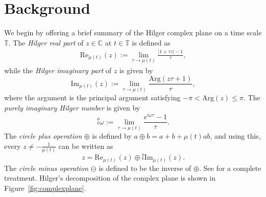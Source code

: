 \documentclass[reqno]{amsart}
\theoremstyle{plain}
\theoremstyle{definition}
\numberwithin{theorem}{section}
\numberwithin{definition}{section}
\numberwithin{prop}{section}
\numberwithin{example}{section}
\newcommand{\C}{\ensuremath{\mathbb{C}}}
\begin{document}
\section{Background}
We begin by offering a brief summary of the Hilger complex plane \cite{BoPeD} on a time scale $\mathbb{T}$. The {\em Hilger real part} of $z \in \C$ at $t \in \mathbb{T}$ is defined as
\begin{eqnarray*}
\text{Re}_{\mu(t)}(z):= \lim_{\tau \to \mu(t)} \frac{|1+\tau z|-1}{\tau},\end{eqnarray*}
while the {\em Hilger imaginary part} of $z$ is given by
\begin{equation}
\label{eq:HilgerImagPart}
    \text{Im}_{\mu(t)}(z):= \lim_{\tau \to \mu(t)}\frac{\text{Arg}(z\tau+1)}{\tau},
\end{equation}
where the argument is the principal argument satisfying $-\pi < \text{Arg} (z) \leq \pi$.  The {\em purely imaginary Hilger number} is given by
$$ \stackrel{o}{\iota} \omega:= \lim_{\tau \to \mu(t)}\frac{e^{i\omega \tau}-1}{\tau}.$$ The {\em circle plus operation} $\oplus$ is defined by $a \oplus b=a+b+\mu(t) ab$, and using this, every $z \neq -\frac{1}{\mu(t)}$ can be written as $$z=\text{Re}_{\mu(t)}(z) \oplus  \stackrel{o}{\iota}  \text{Im}_{\mu(t)}(z).$$
The {\em circle minus operation} $\ominus$ is defined to be the inverse of $\oplus$. See \cite{BoPe} for a complete treatment. Hilger's decomposition of the complex plane is shown in Figure~\ref{fig:complexplane}.
\end{document}
